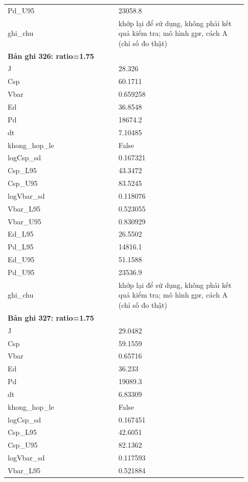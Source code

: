 \begin{longtable}{p{0.43\linewidth}p{0.50\linewidth}}
Pd\_\allowbreak U95 & 23058.8 \\
ghi\_\allowbreak chu & khớp lại để sử dụng, không phải kết quả kiểm tra; mô hình gpr, cách A (chỉ số đo thật) \\
\midrule
\multicolumn{2}{p{0.95\linewidth}}{\textbf{Bản ghi 326: ratio=1.75}} \\
J & 28.326 \\
Csp & 60.1711 \\
Vbar & 0.659258 \\
Ed & 36.8548 \\
Pd & 18674.2 \\
dt & 7.10485 \\
khong\_\allowbreak hop\_\allowbreak le & False \\
logCsp\_\allowbreak sd & 0.167321 \\
Csp\_\allowbreak L95 & 43.3472 \\
Csp\_\allowbreak U95 & 83.5245 \\
logVbar\_\allowbreak sd & 0.118076 \\
Vbar\_\allowbreak L95 & 0.523055 \\
Vbar\_\allowbreak U95 & 0.830929 \\
Ed\_\allowbreak L95 & 26.5502 \\
Pd\_\allowbreak L95 & 14816.1 \\
Ed\_\allowbreak U95 & 51.1588 \\
Pd\_\allowbreak U95 & 23536.9 \\
ghi\_\allowbreak chu & khớp lại để sử dụng, không phải kết quả kiểm tra; mô hình gpr, cách A (chỉ số đo thật) \\
\midrule
\multicolumn{2}{p{0.95\linewidth}}{\textbf{Bản ghi 327: ratio=1.75}} \\
J & 29.0482 \\
Csp & 59.1559 \\
Vbar & 0.65716 \\
Ed & 36.233 \\
Pd & 19089.3 \\
dt & 6.83309 \\
khong\_\allowbreak hop\_\allowbreak le & False \\
logCsp\_\allowbreak sd & 0.167451 \\
Csp\_\allowbreak L95 & 42.6051 \\
Csp\_\allowbreak U95 & 82.1362 \\
logVbar\_\allowbreak sd & 0.117593 \\
Vbar\_\allowbreak L95 & 0.521884 \\

\end{longtable}
